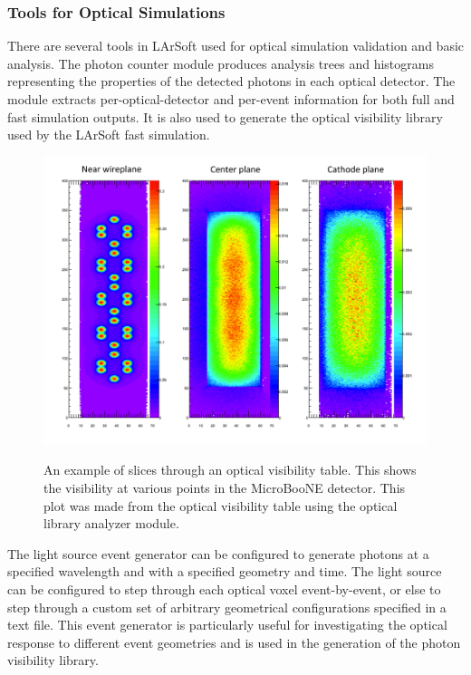 \documentclass[12pt]{elsarticle}
\newcommand{\larsoft}{LArSoft }
\begin{document}
\subsubsection{Tools for Optical Simulations}

There are several tools in \larsoft used for optical simulation validation and basic analysis.  The photon counter module produces analysis trees and histograms representing the properties of the detected photons in each optical detector.  The module extracts per-optical-detector and per-event information for both full and fast simulation outputs.  It is also used to generate the optical visibility library used by the \larsoft fast simulation.

\begin{figure}[h]
\centering
\caption{An example of slices through an optical visibility table. This shows the visibility at various points
in the MicroBooNE detector.  This plot was made from the optical visibility table using the optical library
analyzer module.}
\includegraphics[width=6.0in]{./mtrls/imgs/SampleOpticalMap.pdf}
\label{fig:opticalmap}
\end{figure}

The light source event generator can be configured to generate photons at a specified wavelength and with a specified geometry and time.  The light source can be configured to step through each optical voxel event-by-event, or else to step through a custom set of arbitrary geometrical configurations specified in a text file.  This event generator is particularly useful for investigating the optical response to different event geometries and is used in the generation of the photon visibility library.
\end{document}
